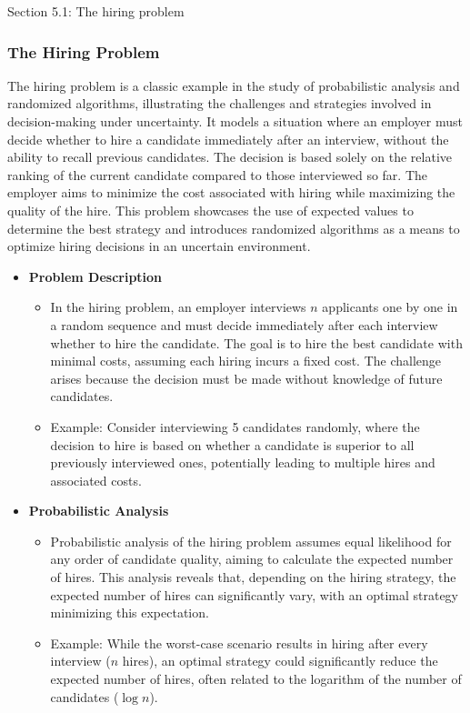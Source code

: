 \begin{notes}{Section 5.1: The hiring problem}
    \subsubsection*{The Hiring Problem}

    The hiring problem is a classic example in the study of probabilistic analysis and randomized algorithms, illustrating the challenges and strategies involved in decision-making under uncertainty. 
    It models a situation where an employer must decide whether to hire a candidate immediately after an interview, without the ability to recall previous candidates. The decision is based solely on 
    the relative ranking of the current candidate compared to those interviewed so far. The employer aims to minimize the cost associated with hiring while maximizing the quality of the hire. This 
    problem showcases the use of expected values to determine the best strategy and introduces randomized algorithms as a means to optimize hiring decisions in an uncertain environment.
    
    \begin{itemize}
        \item \textbf{Problem Description}
        \begin{itemize}
            \item In the hiring problem, an employer interviews $n$ applicants one by one in a random sequence and must decide immediately after each interview whether to hire the candidate. The 
            goal is to hire the best candidate with minimal costs, assuming each hiring incurs a fixed cost. The challenge arises because the decision must be made without knowledge of future candidates.
            \item Example: Consider interviewing 5 candidates randomly, where the decision to hire is based on whether a candidate is superior to all previously interviewed ones, potentially 
            leading to multiple hires and associated costs.
        \end{itemize}
        
        \item \textbf{Probabilistic Analysis}
        \begin{itemize}
            \item Probabilistic analysis of the hiring problem assumes equal likelihood for any order of candidate quality, aiming to calculate the expected number of hires. This analysis reveals 
            that, depending on the hiring strategy, the expected number of hires can significantly vary, with an optimal strategy minimizing this expectation.
            \item Example: While the worst-case scenario results in hiring after every interview ($n$ hires), an optimal strategy could significantly reduce the expected number of hires, often 
            related to the logarithm of the number of candidates ($\log n$).
        \end{itemize}
        

\end{itemize}
\end{notes}

